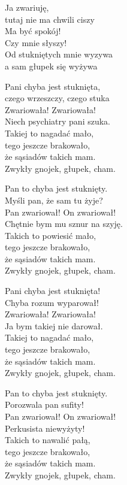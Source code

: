 \begin{text}
    \vin Ja zwariuję,\\
    \vin tutaj nie ma chwili ciszy\\
    \vin Ma być spokój!\\
    \vin Czy mnie słyszy!\\
    \vin Od stukniętych mnie wyzywa\\
    \vin a sam głupek się wyżywa

    Pani chyba jest stuknięta,\\
    czego wrzeszczy, czego stuka\\
    Zwariowała! Zwariowała!\\
    Niech psychiatry pani szuka.\\
    Takiej to nagadać mało,\\
    tego jeszcze brakowało,\\
    że sąsiadów takich mam.\\
    Zwykły gnojek, głupek, cham.

    Pan to chyba jest stuknięty.\\
    Myśli pan, że sam tu żyje?\\
    Pan zwariował! On zwariował!\\
    Chętnie bym mu sznur na szyję.\\
    Takich to powiesić mało,\\
    tego jeszcze brakowało,\\
    że sąsiadów takich mam.\\
    Zwykły gnojek, głupek, cham.

    Pani chyba jest stuknięta!\\
    Chyba rozum wyparował!\\
    Zwariowała! Zwariowała!\\
    Ja bym takiej nie darował.\\
    Takiej to nagadać mało,\\
    tego jeszcze brakowało,\\
    że sąsiadów takich mam.\\
    Zwykły gnojek, głupek, cham.

    Pan to chyba jest stuknięty.\\
    Porozwala pan sufity!\\
    Pan zwariował! On zwariował!\\
    Perkusista niewyżyty!\\
    Takich to nawalić pałą,\\
    tego jeszcze brakowało,\\
    że sąsiadów takich mam.\\
    Zwykły gnojek, głupek, cham.
\end{text}
\begin{chord}

\end{chord}